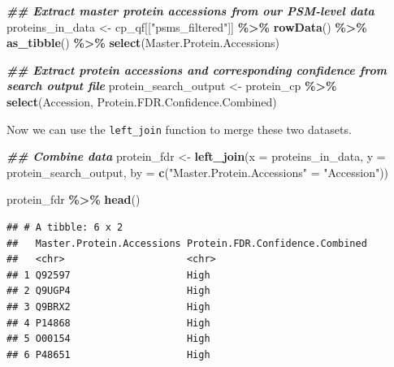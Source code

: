 \documentclass[9pt,a4paper,]{extarticle}
\newenvironment{Shaded}{\begin{snugshade}}{\end{snugshade}}
\newcommand{\AttributeTok}[1]{\textcolor[rgb]{0.13,0.29,0.53}{#1}}
\newcommand{\DocumentationTok}[1]{\textcolor[rgb]{0.56,0.35,0.01}{\textbf{\textit{#1}}}}
\newcommand{\FunctionTok}[1]{\textcolor[rgb]{0.13,0.29,0.53}{\textbf{#1}}}
\newcommand{\NormalTok}[1]{#1}
\newcommand{\OtherTok}[1]{\textcolor[rgb]{0.56,0.35,0.01}{#1}}
\newcommand{\SpecialCharTok}[1]{\textcolor[rgb]{0.81,0.36,0.00}{\textbf{#1}}}
\newcommand{\StringTok}[1]{\textcolor[rgb]{0.31,0.60,0.02}{#1}}
\begin{document}
\begin{Shaded}
\begin{Highlighting}[]
\DocumentationTok{\#\# Extract master protein accessions from our PSM{-}level data}
\NormalTok{proteins\_in\_data }\OtherTok{\textless{}{-}}\NormalTok{ cp\_qf[[}\StringTok{"psms\_filtered"}\NormalTok{]] }\SpecialCharTok{\%\textgreater{}\%}
  \FunctionTok{rowData}\NormalTok{() }\SpecialCharTok{\%\textgreater{}\%}
  \FunctionTok{as\_tibble}\NormalTok{() }\SpecialCharTok{\%\textgreater{}\%}
  \FunctionTok{select}\NormalTok{(Master.Protein.Accessions)}

\DocumentationTok{\#\# Extract protein accessions and corresponding confidence from search output file}
\NormalTok{protein\_search\_output }\OtherTok{\textless{}{-}}\NormalTok{ protein\_cp }\SpecialCharTok{\%\textgreater{}\%}
  \FunctionTok{select}\NormalTok{(Accession, Protein.FDR.Confidence.Combined)}
\end{Highlighting}
\end{Shaded}

Now we can use the \texttt{left\_join} function to merge these two datasets.

\begin{Shaded}
\begin{Highlighting}[]
\DocumentationTok{\#\# Combine data}
\NormalTok{protein\_fdr }\OtherTok{\textless{}{-}} \FunctionTok{left\_join}\NormalTok{(}\AttributeTok{x =}\NormalTok{ proteins\_in\_data, }
                         \AttributeTok{y =}\NormalTok{ protein\_search\_output, }
                         \AttributeTok{by =} \FunctionTok{c}\NormalTok{(}\StringTok{"Master.Protein.Accessions"} \OtherTok{=} \StringTok{"Accession"}\NormalTok{))}

\NormalTok{protein\_fdr }\SpecialCharTok{\%\textgreater{}\%}
  \FunctionTok{head}\NormalTok{()}
\end{Highlighting}
\end{Shaded}

\begin{verbatim}
## # A tibble: 6 x 2
##   Master.Protein.Accessions Protein.FDR.Confidence.Combined
##   <chr>                     <chr>                          
## 1 Q92597                    High                           
## 2 Q9UGP4                    High                           
## 3 Q9BRX2                    High                           
## 4 P14868                    High                           
## 5 O00154                    High                           
## 6 P48651                    High
\end{verbatim}
\end{document}
